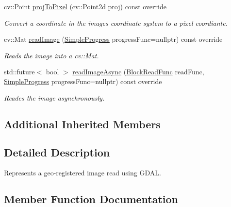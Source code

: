 \begin{DoxyCompactItemize}
cv\+::\+Point \hyperlink{classdg_1_1deepcore_1_1imagery_1_1_gdal_image_a824ec987881152e8ca9d95b0952e75c7}{proj\+To\+Pixel} (cv\+::\+Point2d proj) const override
\begin{DoxyCompactList}\small\item\em Convert a coordinate in the image\textquotesingle{}s coordinate system to a pixel coordiante. \end{DoxyCompactList}\item 
cv\+::\+Mat \hyperlink{classdg_1_1deepcore_1_1imagery_1_1_gdal_image_a2f2dbe1f567c126aa8406ee86f9990d7}{read\+Image} (\hyperlink{group___utility_module_ga6763018df79e4bdbcd8cd14cea5342b2}{Simple\+Progress} progress\+Func=nullptr) const override
\begin{DoxyCompactList}\small\item\em Reads the image into a cv\+::\+Mat. \end{DoxyCompactList}\item 
std\+::future$<$ bool $>$ \hyperlink{classdg_1_1deepcore_1_1imagery_1_1_gdal_image_a5ae4e4f34682f1a9e753dd1534218988}{read\+Image\+Async} (\hyperlink{group___imagery_module_ga2238c2ef34502f68956ddef1f477ad95}{Block\+Read\+Func} read\+Func, \hyperlink{group___utility_module_ga6763018df79e4bdbcd8cd14cea5342b2}{Simple\+Progress} progress\+Func=nullptr) const override
\begin{DoxyCompactList}\small\item\em Reades the image asynchronously. \end{DoxyCompactList}\end{DoxyCompactItemize}
\subsection*{Additional Inherited Members}


\subsection{Detailed Description}
Represents a geo-\/registered image read using G\+D\+AL. 

\subsection{Member Function Documentation}
